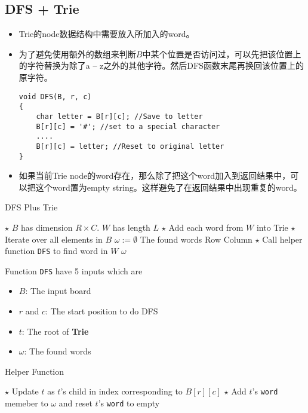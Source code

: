 \subsection{DFS + Trie}
\begin{CJK*}{UTF8}{gbsn}
\begin{itemize}
\item Trie的node数据结构中需要放入所加入的word。
\item 为了避免使用额外的数组来判断$B$中某个位置是否访问过，可以先把该位置上的字符替换为除了a -- z之外的其他字符。然后DFS函数末尾再换回该位置上的原字符。
\begin{lstlisting}[style=customc]
void DFS(B, r, c)
{
 	char letter = B[r][c]; //Save to letter
 	B[r][c] = '#'; //set to a special character
 	....
 	B[r][c] = letter; //Reset to original letter
}
\end{lstlisting}
\item 如果当前Trie node的word存在，那么除了把这个word加入到返回结果中，可以把这个word置为empty string。这样避免了在返回结果中出现重复的word。
\end{itemize}
\end{CJK*}
\setcounter{algorithm}{0}
\begin{algorithm}[H]
\caption{DFS Plus Trie}
\begin{algorithmic}[1]
\State $\star$ $B$ has dimension $R\times C$. $W$ has length $L$
\State $\star$ Add each word from $W$ into Trie
\State $\star$ Iterate over all elements in $B$
\State $\omega:=\emptyset$ \Comment The found words
 \Comment Row
 \Comment Column
\State $\star$ Call helper function \texttt{DFS} to find word in $W$
\State {}
\EndFor
\EndFor
\State \Return $\omega$
\EndProcedure
\end{algorithmic}
\end{algorithm}
Function \texttt{DFS} have 5 inputs which are
\begin{itemize}
\item $B$: The input board
\item $r$ and $c$: The start position to do DFS
\item $t$: The root of \textbf{Trie}
\item $\omega$: The found words
\end{itemize}
\begin{algorithm}[H]
\caption{Helper Function}
\begin{algorithmic}[1]
\State \Return
\EndIf
\State $\star$ Update $t$ as $t$'s child in index corresponding to $B[r][c]$
\State $\star$ Add $t$'s \texttt{word} memeber to $\omega$ and reset $t$'s \texttt{word} to empty
\EndIf
{}
\end{algorithmic}
\end{algorithm}
